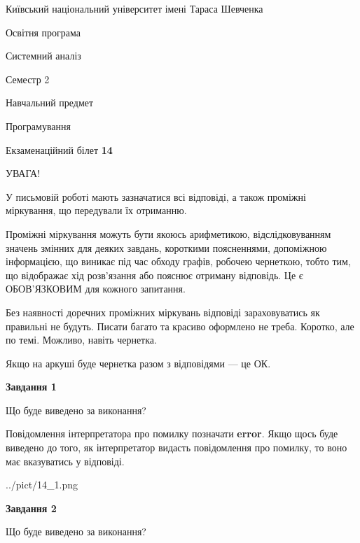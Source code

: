 \documentclass[12pt, ukrainian]{article}
\begin{document}
{{\begin {small}\par
{ \center  Київський національний університет імені Тараса Шевченка \par}
{\parbox {5 cm}{Освітня програма \hfill}{\parbox {7 cm}{Системний аналіз \hfill}}\parbox {6 cm}{\hfill Семестр 2}}\par
{\parbox {5 cm} {Навчальний предмет \hfill}\parbox {7 cm}{Програмування \hfill}\parbox {6cm}{\hfill}\par}\vspace{-7pt} \end{small}}{\center Екзаменаційний білет \No \textbf
{ 14 }\par}}
{
\begin {large}
УВАГА!

У письмовій роботі мають зазначатися всі відповіді, а також проміжні міркування, що передували їх отриманню.

Проміжні міркування можуть бути якоюсь арифметикою, відслідковуванням зна\-чень змінних для деяких завдань,
короткими поясненнями, допоміжною інформацією, що виникає під час обходу графів, робочею чернеткою,
тобто тим, що відображає хід розв’язання або пояснює отриману відповідь.
Це є ОБОВ’ЯЗКОВИМ для кожного запитання.

Без наявності доречних проміжних міркувань відповіді зараховуватись як правиль\-ні не будуть.
Писати багато та красиво оформлено не треба. Коротко, але по темі. Можли\-во, навіть чернетка.

Якщо на аркуші буде чернетка разом з відповідями --- це ОК.

\newpage

{\begin {center}\textbf{Завдання 1}\end {center}}\par
Що буде виведено за виконання?

Повідомлення інтерпретатора про помилку позначати \textbf{error}.
Якщо щось буде виведено до того, як інтерпретатор видасть повідомлення про помилку, 
то воно має вказуватись у відповіді. \par


\begin{center}
	{../pict/14_1.png}
\end{center}
\newpage

{\begin {center}\textbf{Завдання 2}\end {center}}\par
Що буде виведено за виконання?


\end{large}}
\end{document}
